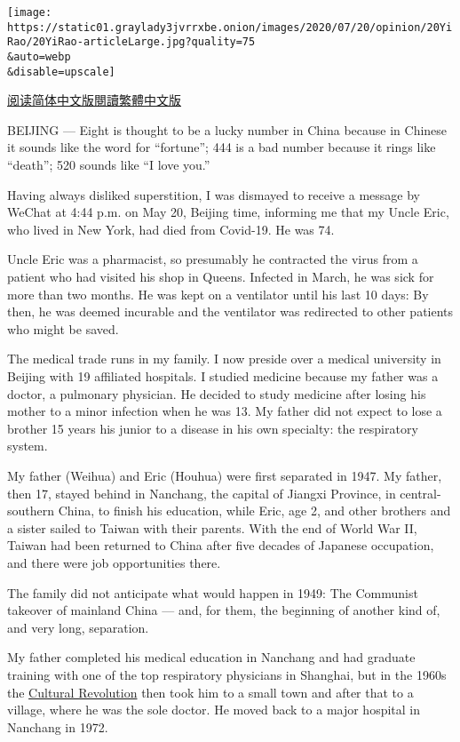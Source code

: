 \texttt{[image: https://static01.graylady3jvrrxbe.onion/images/2020/07/20/opinion/20YiRao/20YiRao-articleLarge.jpg?quality=75\\\&auto=webp\\\&disable=upscale]}

\href{https://cn.nytimes3xbfgragh.onion/opinion/20200723/coronavirus-china-us/}{阅读简体中文版}\href{https://cn.nytimes3xbfgragh.onion/opinion/20200723/coronavirus-china-us/zh-hant/}{閱讀繁體中文版}

BEIJING --- Eight is thought to be a lucky number in China because in
Chinese it sounds like the word for ``fortune''; 444 is a bad number
because it rings like ``death''; 520 sounds like ``I love you.''

Having always disliked superstition, I was dismayed to receive a message
by WeChat at 4:44 p.m. on May 20, Beijing time, informing me that my
Uncle Eric, who lived in New York, had died from Covid-19. He was 74.

Uncle Eric was a pharmacist, so presumably he contracted the virus from
a patient who had visited his shop in Queens. Infected in March, he was
sick for more than two months. He was kept on a ventilator until his
last 10 days: By then, he was deemed incurable and the ventilator was
redirected to other patients who might be saved.

The medical trade runs in my family. I now preside over a medical
university in Beijing with 19 affiliated hospitals. I studied medicine
because my father was a doctor, a pulmonary physician. He decided to
study medicine after losing his mother to a minor infection when he was
13. My father did not expect to lose a brother 15 years his junior to a
disease in his own specialty: the respiratory system.

My father (Weihua) and Eric (Houhua) were first separated in 1947. My
father, then 17, stayed behind in Nanchang, the capital of Jiangxi
Province, in central-southern China, to finish his education, while
Eric, age 2, and other brothers and a sister sailed to Taiwan with their
parents. With the end of World War II, Taiwan had been returned to China
after five decades of Japanese occupation, and there were job
opportunities there.

The family did not anticipate what would happen in 1949: The Communist
takeover of mainland China --- and, for them, the beginning of another
kind of, and very long, separation.

My father completed his medical education in Nanchang and had graduate
training with one of the top respiratory physicians in Shanghai, but in
the 1960s the
\href{https://www.nytimes3xbfgragh.onion/2016/05/15/world/asia/china-cultural-revolution-explainer.html}{Cultural
Revolution} then took him to a small town and after that to a village,
where he was the sole doctor. He moved back to a major hospital in
Nanchang in 1972.

